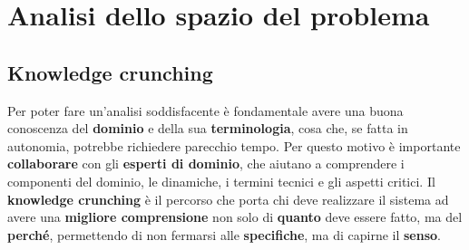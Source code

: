 \chapter{Analisi dello spazio del problema}
	\section{Knowledge crunching}
    Per poter fare un'analisi soddisfacente è fondamentale avere una buona conoscenza del \textbf{dominio} e della sua \textbf{terminologia}, cosa che, se fatta in autonomia, potrebbe richiedere parecchio tempo. Per questo motivo è importante \textbf{collaborare} con gli \textbf{esperti di dominio}, che aiutano a comprendere i componenti del dominio, le dinamiche, i termini tecnici e gli aspetti critici.
    Il \textbf{knowledge crunching} è il percorso che porta chi deve realizzare il sistema ad avere una \textbf{migliore comprensione} non solo di \textbf{quanto} deve essere fatto, ma del \textbf{perché}, permettendo di non fermarsi alle \textbf{specifiche}, ma di capirne il \textbf{senso}. 
    
